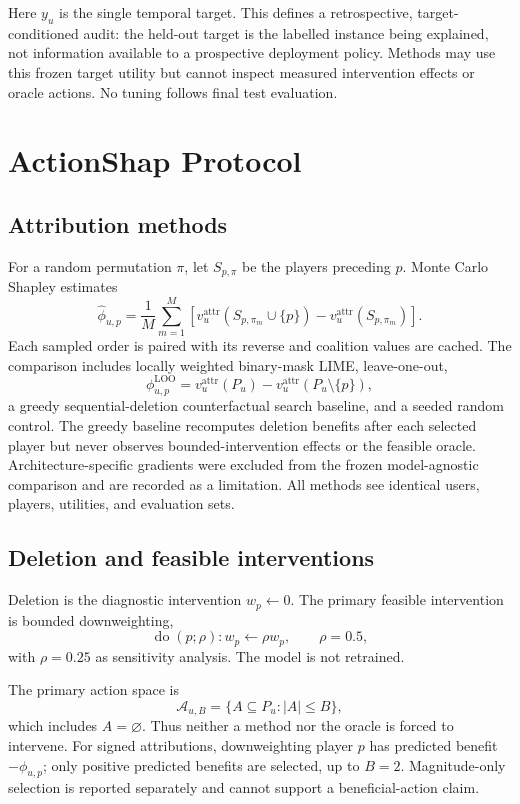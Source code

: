 \documentclass[11pt]{article}
\begin{document}
Here $y_u$ is the single temporal target. This defines a retrospective, target-conditioned audit: the held-out target is the labelled instance being explained, not information available to a prospective deployment policy. Methods may use this frozen target utility but cannot inspect measured intervention effects or oracle actions. No tuning follows final test evaluation.

\section{ActionShap Protocol}
\subsection{Attribution methods}
For a random permutation $\pi$, let $S_{p,\pi}$ be the players preceding $p$. Monte Carlo Shapley estimates
\begin{equation}
\widehat\phi_{u,p}=\frac{1}{M}\sum_{m=1}^{M}
\left[v_u^{\mathrm{attr}}(S_{p,\pi_m}\cup\{p\})-v_u^{\mathrm{attr}}(S_{p,\pi_m})\right].
\end{equation}
Each sampled order is paired with its reverse and coalition values are cached. The comparison includes locally weighted binary-mask LIME, leave-one-out,
\begin{equation}
\phi^{\mathrm{LOO}}_{u,p}=v_u^{\mathrm{attr}}(P_u)-v_u^{\mathrm{attr}}(P_u\setminus\{p\}),
\end{equation}
a greedy sequential-deletion counterfactual search baseline, and a seeded random control. The greedy baseline recomputes deletion benefits after each selected player but never observes bounded-intervention effects or the feasible oracle. Architecture-specific gradients were excluded from the frozen model-agnostic comparison and are recorded as a limitation. All methods see identical users, players, utilities, and evaluation sets.

\subsection{Deletion and feasible interventions}
Deletion is the diagnostic intervention $w_p\leftarrow0$. The primary feasible intervention is bounded downweighting,
\begin{equation}
\operatorname{do}(p;\rho): w_p\leftarrow\rho w_p,\qquad \rho=0.5,
\end{equation}
with $\rho=0.25$ as sensitivity analysis. The model is not retrained.

The primary action space is
\begin{equation}
\mathcal A_{u,B}=\{A\subseteq P_u:|A|\le B\},
\end{equation}
which includes $A=\varnothing$. Thus neither a method nor the oracle is forced to intervene. For signed attributions, downweighting player $p$ has predicted benefit $-\phi_{u,p}$; only positive predicted benefits are selected, up to $B=2$. Magnitude-only selection is reported separately and cannot support a beneficial-action claim.
\end{document}
